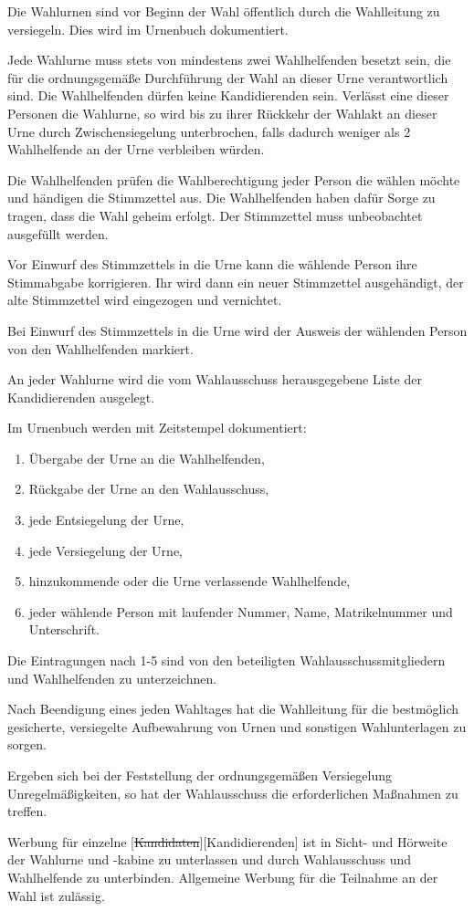 \documentclass[%
draft,%
multilinesections%
]{fswo}
\newcommand\oldT[1]  {{\color{Gray}[\st{#1}]}}
\newcommand\newT[1]  {{\color{Green}[#1]}}
\newcommand\oldT[1]{}%
\newcommand\newT[1]{#1}
\newcommand\change[2]{\oldT{#1}\newT{#2}}
\begin{document}
\begin{contract}
Die Wahlurnen sind vor Beginn der Wahl öffentlich durch die Wahlleitung zu versiegeln.
Dies wird im Urnenbuch dokumentiert.

Jede Wahlurne muss stets von mindestens zwei Wahlhelfenden besetzt sein, die für die ordnungsgemäße Durchführung der Wahl an dieser Urne verantwortlich sind.
Die Wahlhelfenden dürfen keine Kandidierenden sein.
Verlässt eine dieser Personen die Wahlurne, so wird bis zu ihrer Rückkehr der Wahlakt an dieser Urne durch Zwischensiegelung unterbrochen, falls dadurch weniger als 2 Wahlhelfende an der Urne verbleiben würden.

Die Wahlhelfenden prüfen die Wahlberechtigung jeder Person die wählen möchte und händigen die Stimmzettel aus.
Die Wahlhelfenden haben dafür Sorge zu tragen, dass die Wahl geheim erfolgt.
Der Stimmzettel muss unbeobachtet ausgefüllt werden.

Vor Einwurf des Stimmzettels in die Urne kann die wählende Person ihre Stimmabgabe korrigieren.
Ihr wird dann ein neuer Stimmzettel ausgehändigt, der alte Stimmzettel wird eingezogen und vernichtet.

Bei Einwurf des Stimmzettels in die Urne wird der Ausweis der wählenden Person von den Wahlhelfenden markiert.

An jeder Wahlurne wird die vom Wahlausschuss herausgegebene Liste der Kandidierenden ausgelegt.

Im Urnenbuch werden mit Zeitstempel dokumentiert:
\begin{enumerate}
\item Übergabe der Urne an die Wahlhelfenden,
\item Rückgabe der Urne an den Wahlausschuss,
\item jede Entsiegelung der Urne,
\item jede Versiegelung der Urne,
\item hinzukommende oder die Urne verlassende Wahlhelfende,
\item jeder wählende Person mit laufender Nummer, Name, Matrikelnummer und Unterschrift.
\end{enumerate}
Die Eintragungen nach 1-5 sind von den beteiligten Wahlausschussmitgliedern und Wahlhelfenden zu unterzeichnen.

Nach Beendigung eines jeden Wahltages hat die Wahlleitung für die bestmöglich gesicherte, versiegelte Aufbewahrung von Urnen und sonstigen Wahlunterlagen zu sorgen.

Ergeben sich bei der Feststellung der ordnungsgemäßen Versiegelung Unregelmäßigkeiten, so hat der Wahlausschuss die erforderlichen Maßnahmen zu treffen.

Werbung für einzelne \change{Kandidaten}{Kandidierenden} ist in Sicht- und Hörweite der Wahlurne und -kabine zu unterlassen und durch Wahlausschuss und Wahlhelfende zu unterbinden.
Allgemeine Werbung für die Teilnahme an der Wahl ist zulässig.
\end{contract}
\end{document}
